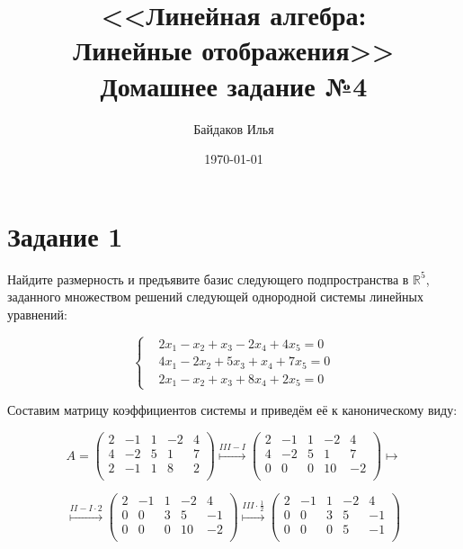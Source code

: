 \documentclass[a4paper,12pt]{article}
\newcommand{\ssolve}{\par\vspace{5pt}\noindent{\bf Решение. }\par}
\begin{document}
\title{<<Линейная алгебра:\\ Линейные отображения>>\\ \vspace{12pt} Домашнее задание №4}
\author{Байдаков Илья}
\date{\today}
\maketitle

\section*{Задание 1}
Найдите размерность и предъявите базис следующего подпространства в $\mathbb{R}^5$, заданного множеством решений следующей однородной системы линейных уравнений:

\[
\left\{
\begin{aligned}
& 2x_1 - x_2 + x_3 - 2x_4 + 4x_5 = 0\\
& 4x_1 - 2x_2 + 5x_3 + x_4 + 7x_5 = 0\\
& 2x_1 - x_2 + x_3 + 8x_4 + 2x_5 = 0
\end{aligned}
\right.
\]
\vspace{5pt}
\ssolve
Составим матрицу коэффициентов системы и приведём её к каноническому виду: \par
$$
A=
\begin{pmatrix}
2&-1&1&-2&4\\
4&-2&5&1&7\\
2&-1&1&8&2\\
\end{pmatrix}
\overset{III-I}{\longmapsto}
\begin{pmatrix}
2&-1&1&-2&4\\
4&-2&5&1&7\\
0&0&0&10&-2\\
\end{pmatrix}
\longmapsto
$$

$$
\overset{II-I \cdot 2}{\longmapsto}
\begin{pmatrix}
2&-1&1&-2&4\\
0&0&3&5&-1\\
0&0&0&10&-2\\
\end{pmatrix}
\overset{III \cdot \frac{1}{2}}{\longmapsto}
\begin{pmatrix}
2&-1&1&-2&4\\
0&0&3&5&-1\\
0&0&0&5&-1\\
\end{pmatrix}
$$ 
\end{document}
